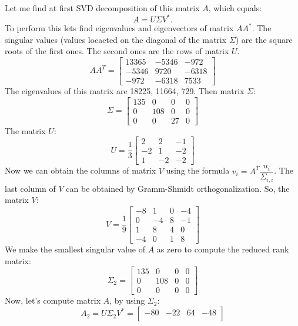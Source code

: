 \documentclass[12pt]{report}
\begin{document}
\begin{solution}
    Let me find at first SVD decomposition of this matrix $A$, which equals:
    \[
         A = U\Sigma V^*.
    \]
    To perform this lets find eigenvalues and eigenvectors of matrix $AA^*$. The singular values (values locaeted on the diagonal of the matrix $\Sigma$) are the square roots of the first ones. The second ones are the rows of matrix $U$.
    \[
       AA^T = \begin{bmatrix}
         13365 & -5346 & -972 \\
         -5346 & 9720 & -6318 \\
         -972 & -6318 & 7533
       \end{bmatrix}
    \]
    The eigenvalues of this matrix are 18225, 11664, 729. Then matrix $\Sigma$:
    \[
       \Sigma = \begin{bmatrix}
         135 & 0 & 0 & 0\\
         0 & 108 & 0 & 0\\
         0 & 0 & 27 & 0
       \end{bmatrix}
    \]
    The matrix $U$:
    \[ U = \dfrac{1}{3} \begin{bmatrix}
         2 & 2 & -1 \\
         -2 & 1 & -2 \\
         1 & -2 & -2
    \end{bmatrix} 
    \]
    Now we can obtain the columns of matrix $V$ using the formula $v_i = A^T\dfrac{u_i}{\Sigma_{i,i}}$. The last column of $V$ can be obtained by Gramm-Shmidt orthogonalization. So, the matrix $V$:
    \[
         V = \dfrac{1}{9} \begin{bmatrix}
            -8 & 1 & 0 & -4 \\
            0 & -4 & 8 & -1 \\
            1 & 8 & 4 & 0\\
            -4 & 0 & 1 & 8
         \end{bmatrix}
    \]
    We make the smallest singular value of $A$ as zero to compute the reduced rank matrix:
    \[
         \Sigma_2 = \begin{bmatrix}
            135 & 0 & 0 & 0 \\
            0 & 108 & 0 & 0\\
            0& 0 & 0 & 0
         \end{bmatrix}
    \]
    Now, let's compute matrix $A$, by using $\Sigma_2$:
    \[
         A_2 = U \Sigma_2 V^* = \begin{bmatrix}
            -80 & -22 & 64 & -48 \\

\end{bmatrix}\]
\end{solution}
\end{document}
